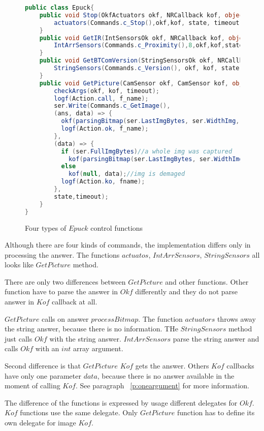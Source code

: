 \begin{figure}[!hbp]
\begin{lstlisting}[language=cs]
public class Epuck{
	public void Stop(OkfActuators okf, NRCallback kof, object state, double timeout) {
		actuators(Commands.c_Stop(),okf,kof, state, timeout, "Stop(..)");
	}
	public void GetIR(IntSensorsOk okf, NRCallback kof, object state, double timeout) {
		IntArrSensors(Commands.c_Proximity(),8,okf,kof,state,timeout,"GetIR(..)");
	}
	public void GetBTComVersion(StringSensorsOk okf, NRCallback kof, object state, double timeout) {
		StringSensors(Commands.c_Version(), okf, kof, state, timeout, "BTComVersion(..)");
	}
	public void GetPicture(CamSensor okf, CamSensor kof, object state, double timeout) {
		checkArgs(okf, kof, timeout);
		logf(Action.call, f_name);
		ser.Write(Commands.c_GetImage(),
		(ans, data) => {
		  okf(parsingBitmap(ser.LastImgBytes, ser.WidthImg, ser.HeightImg, ser.ModeImg), data);
		  logf(Action.ok, f_name);
		},
		(data) => {
		  if (ser.FullImgBytes)//a whole img was captured
		    kof(parsingBitmap(ser.LastImgBytes, ser.WidthImg, ser.HeightImg, ser.ModeImg), data);
		  else
		    kof(null, data);//img is demaged
		  logf(Action.ko, fname);
		},
		state,timeout);		
	}	   
}
\end{lstlisting}
\caption{Four types of $Epuck$ control functions}
\label{publicep}	
\end{figure}

	Although there are four kinds of commands, the implementation differs only in processing the answer.
	The functions $actuatos$, $IntArrSensors$, $StringSensors$ all looks like $GetPicture$ method.
	
	There are only two differences between $GetPicture$ and other functions.
	Other function have to parse the answer in $Okf$ differently and they do not parse
	answer in $Kof$ callback at all.

	$GetPicture$ calls on answer $processBitmap$.
	The function $actuators$ throws away the string answer, because there is no information.
	THe $StringSensors$ method just calls $Okf$ with the string answer.
	$IntArrSensors$ parse the string answer and calls $Okf$ with an $int$ array argument.

	Second difference is that $GetPicture$ $Kof$ gets the answer. Others $Kof$ callbacks have
	only one parameter $data$, because there is no answer available in the moment of calling $Kof$.
	See paragraph ~\ref{p:oneargument} for more information.

	The difference of the functions is expressed by usage different
	delegates for $Okf$. $Kof$ functions use the same delegate. Only $GetPicture$ function has to 
	define its own delegate for image $Kof$.

